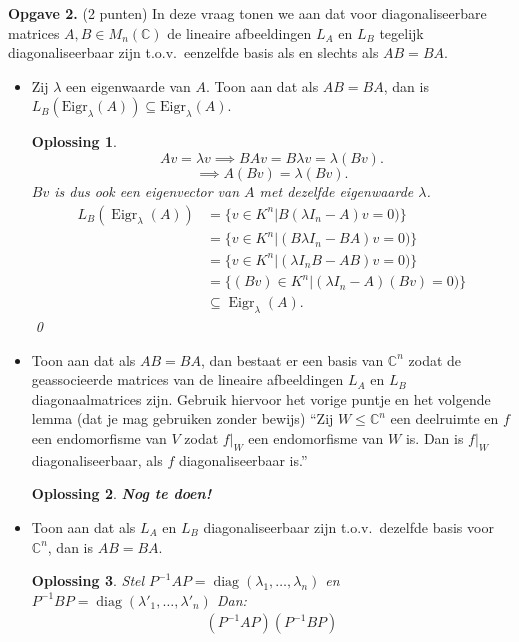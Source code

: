 \documentclass[a4paper,12pt]{article}
\newtheorem{oplossing}{Oplossing}
\begin{document}
\begin{enumerate}
\textbf{Opgave 2.} (2 punten) In deze vraag tonen we aan dat voor diagonaliseerbare matrices $A, B \in M_n(\mathbb{C})$ de lineaire afbeeldingen $L_A$ en $L_B$ tegelijk diagonaliseerbaar zijn t.o.v.\ eenzelfde basis als en slechts als $AB = BA$.
\begin{itemize}
    \item[(i)] Zij $\lambda$ een eigenwaarde van $A$. Toon aan dat als $AB = BA$, dan is $L_B(\text{Eigr}_\lambda(A)) \subseteq \text{Eigr}_\lambda(A)$.
    \begin{oplossing}
        \[A v = \lambda v \implies BAv = B\lambda v = \lambda (Bv). \]
        \[\implies A(Bv) = \lambda(Bv).\]
        \(Bv\) is dus ook een eigenvector van \(A\) met dezelfde eigenwaarde \(\lambda\).
        \begin{align*}
            L_B (\operatorname{Eigr}_\lambda (A))
            &= \{ v\in K^n | B(\lambda I_n - A)v = 0)\} \\
            &= \{ v\in K^n | (B\lambda I_n - BA)v = 0)\} \\
            &=\{ v\in K^n | (\lambda I_n B - A B)v = 0)\} \\
            &= \{ (Bv)\in K^n | (\lambda I_n - A)(Bv) = 0)\}\\
            &\subseteq \operatorname{Eigr}_\lambda (A).
        \end{align*}\qed
    \end{oplossing}
    \item[(ii)] Toon aan dat als $AB = BA$, dan bestaat er een basis van $\mathbb{C}^n$ zodat de geassocieerde matrices van de lineaire afbeeldingen $L_A$ en $L_B$ diagonaalmatrices zijn. Gebruik hiervoor het vorige puntje en het volgende lemma (dat je mag gebruiken zonder bewijs) ``Zij $W \leq \mathbb{C}^n$ een deelruimte en $f$ een endomorfisme van $V$ zodat $f|_W$ een endomorfisme van $W$ is. Dan is $f|_W$ diagonaliseerbaar, als $f$ diagonaliseerbaar is.''
    \begin{oplossing}
        \textbf{Nog te doen!}
    \end{oplossing}
    \item[(iii)] Toon aan dat als $L_A$ en $L_B$ diagonaliseerbaar zijn t.o.v.\ dezelfde basis voor $\mathbb{C}^n$, dan is $AB = BA$.
    \begin{oplossing}
        Stel \(P^{-1} A P = \operatorname{diag}(\lambda_1,\dots,\lambda_n)\) en \(P^{-1} B P = \operatorname{diag}(\lambda'_1,\dots,\lambda'_n)\)
        Dan:
        \begin{align*}
            (P^{-1} A P)(P^{-1} B P)

\end{align*}
\end{oplossing}
\end{itemize}
\end{enumerate}
\end{document}
